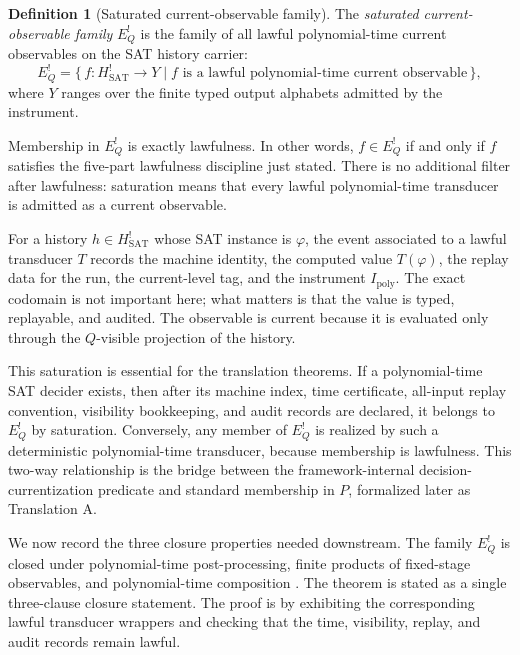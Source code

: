\documentclass[11pt]{article}
\newcommand{\Hsat}{H^{!}_{\mathrm{SAT}}}
\newcommand{\Ipoly}{I_{\mathrm{poly}}}
\newcommand{\EQbang}{E^{!}_{Q}}
\theoremstyle{definition}
\newtheorem{definition}[theorem]{Definition}
\begin{document}
\begin{definition}[Saturated current-observable family]
\label{def:pvnp:e-q-saturation}
The \emph{saturated current-observable family} \(\EQbang\) is the
family of all lawful polynomial-time current observables on the SAT
history carrier:
\[
  \EQbang
  =
  \{\, f:\Hsat\to Y
      \mid
      f \text{ is a lawful polynomial-time current observable} \,\},
\]
where \(Y\) ranges over the finite typed output alphabets admitted by
the instrument.
\end{definition}

Membership in \(\EQbang\) is exactly lawfulness.  In other words,
\(f\in\EQbang\) if and only if \(f\) satisfies the five-part
lawfulness discipline just stated.  There is no additional filter
after lawfulness: saturation means that every lawful polynomial-time
transducer is admitted as a current observable.

For a history \(h\in\Hsat\) whose SAT instance is \(\varphi\), the
event associated to a lawful transducer \(T\) records the machine
identity, the computed value \(T(\varphi)\), the replay data for the
run, the current-level tag, and the instrument \(\Ipoly\).  The exact
codomain is not important here; what matters is that the value is
typed, replayable, and audited.  The observable is current because it
is evaluated only through the \(Q\)-visible projection of the history.

This saturation is essential for the translation theorems.  If a
polynomial-time SAT decider exists, then after its machine index, time
certificate, all-input replay convention, visibility bookkeeping, and
audit records are declared, it belongs to \(\EQbang\) by saturation.
Conversely, any member of \(\EQbang\) is realized by such a
deterministic polynomial-time transducer, because membership is
lawfulness.  This two-way relationship is the bridge between the
framework-internal decision-currentization predicate and standard
membership in \(P\), formalized later as Translation A.

We now record the three closure properties needed downstream.  The
family \(\EQbang\) is closed under polynomial-time post-processing,
finite products of fixed-stage observables, and polynomial-time
composition \citep{Goldreich2008ConceptualComplexity,AroraBarak2009Complexity}.  The theorem is stated as a single three-clause closure
statement.  The proof is by exhibiting the corresponding lawful
transducer wrappers and checking that the time, visibility, replay,
and audit records remain lawful.
\end{document}
